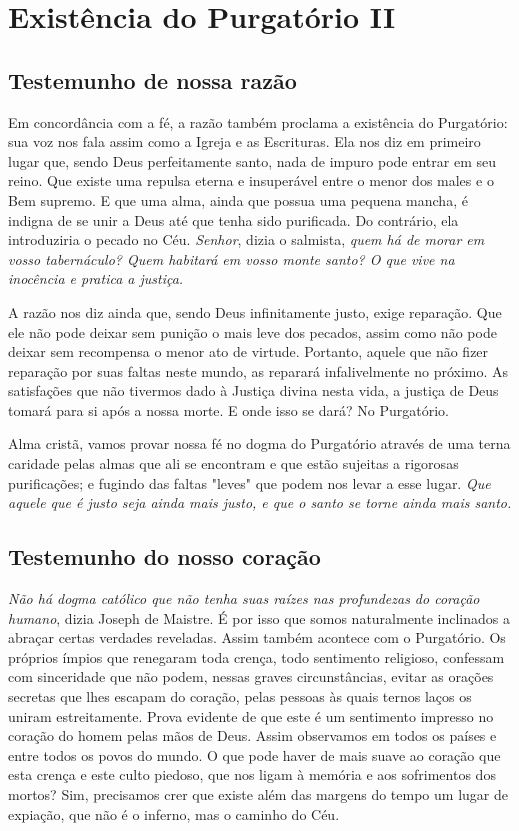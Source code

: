 \renewcommand{\thechapterdisplay}{Quarto dia}
\renewcommand{\thechapterrunner}{Existência do Purgatório II}
\chapter[Quarto dia --- Existência do Purgatório II]{Existência do Purgatório II}
\section*{Testemunho de nossa razão}

Em concordância com a fé, a razão também proclama a existência do Purgatório: sua voz nos fala assim como a Igreja e as Escrituras. Ela nos diz em primeiro lugar que, 
sendo Deus perfeitamente santo, nada de impuro pode entrar em seu reino. Que existe uma 
repulsa eterna e insuperável entre o menor dos males e o Bem supremo. E que uma alma, ainda que possua uma pequena mancha, é indigna de se unir a Deus até que tenha sido purificada. Do contrário, ela introduziria o pecado no Céu. \textit{Senhor}, dizia o salmista, \textit{quem há de morar em vosso tabernáculo? Quem habitará em vosso monte santo? O que vive na inocência e pratica a justiça.} 

A razão nos diz ainda que, sendo Deus infinitamente justo, exige reparação. Que ele
não pode deixar sem punição o mais leve dos pecados, assim como não pode deixar sem 
recompensa o menor ato de virtude. Portanto, aquele que não fizer reparação por suas
faltas neste mundo, as reparará infalivelmente no próximo. As satisfações que não tivermos dado à Justiça divina nesta vida, a justiça de Deus tomará para si após a 
nossa morte. E onde isso se dará? No Purgatório. 

Alma cristã, vamos provar nossa fé no dogma do Purgatório através de uma terna caridade 
pelas almas que ali se encontram e que estão sujeitas a rigorosas purificações; e fugindo das faltas "leves" que podem nos levar a esse lugar. \textit{Que aquele que é justo seja ainda mais justo, e que o santo se torne ainda mais santo.}


\section*{Testemunho do nosso coração}

\textit{Não há dogma católico que não tenha suas raízes nas profundezas do coração humano}, dizia Joseph de Maistre. É por isso que somos naturalmente inclinados a abraçar certas verdades reveladas. Assim também acontece com o Purgatório. Os próprios ímpios que renegaram toda crença, todo sentimento religioso, confessam com sinceridade que não podem, nessas graves circunstâncias, evitar as orações secretas que lhes escapam do coração, pelas pessoas às quais ternos laços os uniram estreitamente. Prova evidente de que este é um sentimento impresso no coração do homem pelas mãos de Deus. Assim observamos em todos os países e entre todos os povos do mundo. O que pode haver de mais suave ao coração que esta crença e este culto piedoso, que nos ligam à memória e aos sofrimentos dos mortos? Sim, precisamos crer que existe além das margens do tempo um lugar de expiação, que não é o inferno, mas o caminho do Céu.

